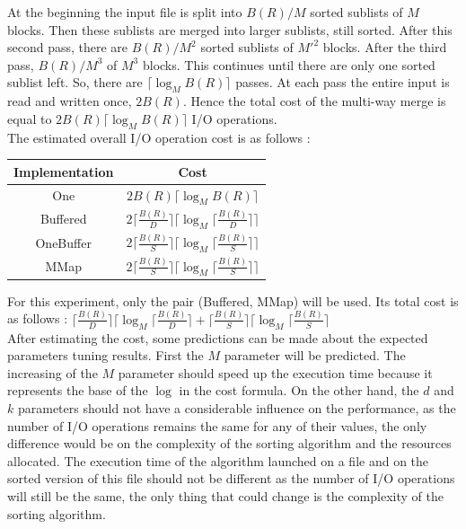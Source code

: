 \documentclass[12pt]{article}
\begin{document}
At the beginning the input file is split into $B(R) / M$ sorted sublists of $M$ blocks. Then these sublists are merged into larger sublists, still sorted. After this second pass, there are $B(R) / M^2$ sorted sublists of $M'^2$ blocks. After the third pass, $B(R) / M^3$ of $M^3$ blocks. This continues until there are only one sorted sublist left. So, there are $ \lceil \log_{M}B(R) \rceil $ passes. At each pass the entire input is read and written once, $2 B(R)$. Hence the total cost of the multi-way merge is equal to $ 2B(R) \lceil \log_{M}B(R) \rceil $ I/O operations.\\

The estimated overall I/O operation cost is as follows :

\begin{center}
\begin{tabular}{|c|c|}
\hline
\textbf{Implementation} & \textbf{Cost} \\
\hline\hline
One & $ 2B(R) \lceil \log_{M}B(R) \rceil $ \\
[5pt]\hline
Buffered & $ 2\lceil\frac{B(R)}{D}\rceil \lceil \log_{M}\lceil\frac{B(R)}{D}\rceil \rceil $ \\
[5pt]\hline
OneBuffer & $ 2\lceil\frac{B(R)}{S}\rceil \lceil \log_{M}\lceil\frac{B(R)}{S}\rceil \rceil $  \\
[5pt]\hline
MMap & $ 2\lceil\frac{B(R)}{S}\rceil \lceil \log_{M}\lceil\frac{B(R)}{S}\rceil \rceil $ \\
[5pt]\hline
\end{tabular}
\end{center}

For this experiment, only the pair (Buffered, MMap) will be used. Its total cost is as follows : $\lceil\frac{B(R)}{D}\rceil \lceil \log_{M}\lceil\frac{B(R)}{D}\rceil + \lceil\frac{B(R)}{S}\rceil \lceil \log_{M}\lceil\frac{B(R)}{S}\rceil$\\

After estimating the cost, some predictions can be made about the expected parameters tuning results. First the $M$ parameter will be predicted. The increasing of the $M$ parameter should speed up the execution time because it represents the base of the $\log$ in the cost formula. On the other hand, the $d$ and $k$ parameters should not have a considerable influence on the performance, as the number of I/O operations remains the same for any of their values, the only difference would be on the complexity of the sorting algorithm and the resources allocated. The execution time of the algorithm launched on a file and on the sorted version of this file should not be different as the number of I/O operations will still be the same, the only thing that could change is the complexity of the sorting algorithm.
\end{document}
